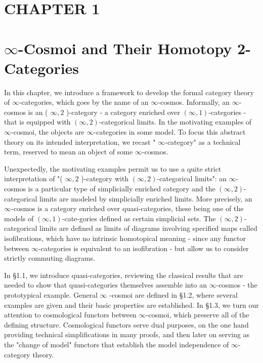 \documentclass[10pt]{article}
\begin{document}
\captionsetup{singlelinecheck=false}
\section*{CHAPTER 1}
\section*{$\infty$-Cosmoi and Their Homotopy 2-Categories}
In this chapter, we introduce a framework to develop the formal category theory of $\infty$-categories, which goes by the name of an $\infty$-cosmos. Informally, an $\infty$-cosmos is an ( $\infty, 2$ )-category - a category enriched over $(\infty, 1)$-categories - that is equipped with $(\infty, 2)$-categorical limits. In the motivating examples of $\infty$-cosmoi, the objects are $\infty$-categories in some model. To focus this abstract theory on its intended interpretation, we recast " $\infty$-category" as a technical term, reserved to mean an object of some $\infty$-cosmos.

Unexpectedly, the motivating examples permit us to use a quite strict interpretation of "( $\infty, 2$ )-category with $(\infty, 2)$-categorical limits": an $\infty$-cosmos is a particular type of simplicially enriched category and the $(\infty, 2)$-categorical limits are modeled by simplicially enriched limits. More precisely, an $\infty$-cosmos is a category enriched over quasi-categories, these being one of the models of $(\infty, 1)$-cate-gories defined as certain simplicial sets. The $(\infty, 2)$-categorical limits are defined as limits of diagrams involving specified maps called isofibrations, which have no intrinsic homotopical meaning - since any functor between $\infty$-categories is equivalent to an isofibration - but allow us to consider strictly commuting diagrams.

In §1.1, we introduce quasi-categories, reviewing the classical results that are needed to show that quasi-categories themselves assemble into an $\infty$-cosmos - the prototypical example. General $\infty$ -cosmoi are defined in §1.2, where several examples are given and their basic properties are established. In §1.3, we turn our attention to cosmological functors between $\infty$-cosmoi, which preserve all of the defining structure. Cosmological functors serve dual purposes, on the one hand providing technical simplifications in many proofs, and then later on serving as the "change of model" functors that establish the model independence of $\infty$-category theory.
\end{document}

